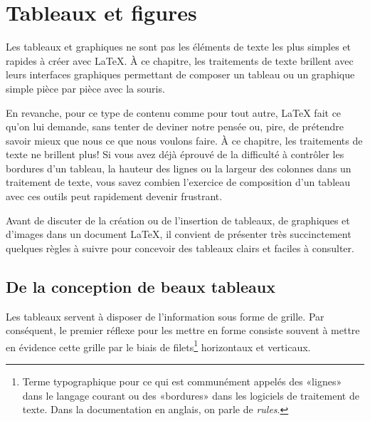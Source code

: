 
\chapter{Tableaux et figures}
\label{chap:tableaux}

Les tableaux et graphiques ne sont pas les éléments de texte les plus
simples et rapides à créer avec {\LaTeX}. À ce chapitre, les
traitements de texte brillent avec leurs interfaces graphiques
permettant de composer un tableau ou un graphique simple pièce par
pièce avec la souris.

En revanche, pour ce type de contenu comme pour tout autre, {\LaTeX}
fait ce qu'on lui demande, sans tenter de deviner notre pensée ou,
pire, de prétendre savoir mieux que nous ce que nous voulons faire. À
ce chapitre, les traitements de texte ne brillent plus! Si vous avez
déjà éprouvé de la difficulté à contrôler les bordures d'un tableau,
la hauteur des lignes ou la largeur des colonnes dans un traitement de
texte, vous savez combien l'exercice de composition d'un tableau avec
ces outils peut rapidement devenir frustrant.

Avant de discuter de la création ou de l'insertion de tableaux, de
graphiques et d'images dans un document {\LaTeX}, il convient de
présenter très succinctement quelques règles à suivre pour concevoir
des tableaux clairs et faciles à consulter.


\section{De la conception de beaux tableaux}
\label{sec:tableaux:booktabs}

Les tableaux servent à disposer de l'information sous forme de
grille. Par conséquent, le premier réflexe pour les mettre en forme
consiste souvent à mettre en évidence cette grille par le biais de
filets\footnote{%
  Terme typographique pour ce qui est communément appelés des «lignes»
  dans le langage courant ou des «bordures» dans les logiciels de
  traitement de texte. Dans la documentation en anglais, on parle de
  \emph{rules}.} %
horizontaux et verticaux.

